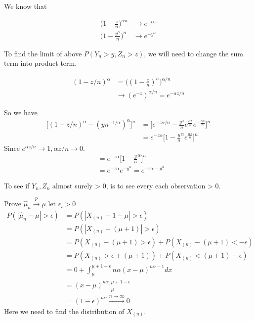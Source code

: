 \documentclass[11pt]{article} %
\begin{document}
We know that 

\begin{align*}
	\Big(1 - \frac{z}{n}\Big)^{\alpha n}  & \rightarrow e^{-\alpha z}\\
    \Big(1 - \frac{y^{\alpha}}{n}\Big)^{ n}  & \rightarrow e^{- y^{\alpha}}
\end{align*} 

To find the limit of above $P(Y_n > y, Z_n >z)$, we will need to change the sum term into product term. 

	\begin{align*}
		(1- z/n)^{\alpha} &= \Big((1- \frac{z}{n})^{n}\Big)^{\alpha/n}\\
		& \rightarrow (e^{-z})^{\alpha/n} = e^{-\alpha z/n}
	\end{align*} 

So we have 
	\begin{align*}
	\Bigg[ (1- z/n)^{\alpha} - (yn^{-1/\alpha})^{\alpha} \Bigg]^n &= \Bigg[ e^{- z \alpha/n} - \frac{y^{\alpha}}{n} e^{\frac{\alpha z}{n}}  e^{- \frac{\alpha z}{n}} \Bigg]^n \\
	&= e^{-z \alpha} \Bigg[ 1- \frac{y}{n}^{\alpha} e^{\frac{\alpha z}{n}}\Bigg]^n
\end{align*} 
	Since $e^{\alpha z/n} \rightarrow 1, \alpha z/n \rightarrow 0$. 
	\begin{align*}
	&= e^{-z \alpha} \Bigg[ 1- \frac{y}{n}^{\alpha} \Bigg]^n \\
	&= e^{-z \alpha} e^{-y^{\alpha}} = e^{-z \alpha-y^{\alpha}} 
\end{align*} 	
	
To see if $Y_n, Z_n$ almost surely > 0, is to see every each observation > 0. 

Prove $\hat{\mu}_n \xrightarrow {p} \mu$
let $\epsilon_i > 0$
\begin{align*}
	P(|\hat{\mu}_n - \mu| > \epsilon) &= P(| X_{(n)} - 1 - \mu| > \epsilon) \\
	&= P(| X_{(n)} - (\mu + 1)| > \epsilon) \\
	&= P(X_{(n)} - (\mu + 1) > \epsilon) + P(X_{(n)} - (\mu + 1) < -\epsilon) \\
	&= P(X_{(n)}  > \epsilon + (\mu + 1)) + P(X_{(n)} < (\mu + 1)  -\epsilon) \\
	&= 0 + \int_{\mu}^{\mu+1-\epsilon} n \alpha (x-\mu)^{n\alpha -1} dx \\
	&= (x-\mu)^{n \alpha} \Bigg |_{\mu}^{\mu+1 -\epsilon} \\
	&= (1- \epsilon)^{n\alpha} \xrightarrow{n \rightarrow \infty} 0
\end{align*} 
Here we need to find the distribution of $X_{(n)}$. 
\end{document}

